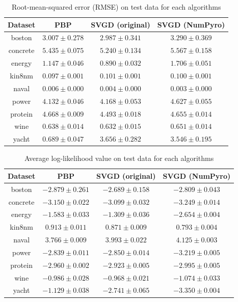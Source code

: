 \begin{table}[]
\centering
\caption{Root-mean-squared error (RMSE) on test data for each algorithms} 
\label{tab:bnn_rmse}
\begin{tabular}{|c|ccc|}
\hline
 Dataset & PBP & SVGD (original) & SVGD (NumPyro)  \\
 \hline
boston & $3.007 \pm 0.278$ & $2.987 \pm 0.341$ & $3.290 \pm 0.369$ \\
concrete & $5.435 \pm 0.075$ & $5.240 \pm 0.134$ & $5.567 \pm 0.158$ \\
energy & $1.147 \pm 0.046$ & $0.890 \pm 0.032$ & $1.706 \pm 0.051$ \\
kin8nm & $0.097 \pm 0.001$ & $0.101 \pm 0.001$ & $0.100 \pm 0.001$ \\
naval & $0.006 \pm 0.000$ & $0.004 \pm 0.000$ & $0.003 \pm 0.000$ \\
power & $4.132 \pm 0.046$ & $4.168 \pm 0.053$ & $4.627 \pm 0.055$ \\
protein & $4.668 \pm 0.009$ & $4.493 \pm 0.018$ & $4.655 \pm 0.014$ \\
wine & $0.638 \pm 0.014$ & $0.632 \pm 0.015$ & $0.651 \pm 0.014$ \\
yacht & $0.689 \pm 0.047$ & $3.656 \pm 0.282$ & $3.546 \pm 0.195$ \\
\hline
\end{tabular}
\end{table}

\begin{table}[]
\centering
\caption{Average log-likelihood value on test data for each algorithms} 
\label{tab:bnn_logl}
\begin{tabular}{|c|ccc|}
\hline
 Dataset & PBP & SVGD (original) & SVGD (NumPyro)  \\
 \hline
boston & $-2.879 \pm 0.261$ & $-2.689 \pm 0.158$ & $-2.809 \pm 0.043$ \\
concrete & $-3.150 \pm 0.022$ & $-3.099 \pm 0.032$ & $-3.249 \pm 0.014$ \\
energy & $-1.583 \pm 0.033$ & $-1.309 \pm 0.036$ & $-2.654 \pm 0.004$ \\
kin8nm & $0.913 \pm 0.011$ & $0.871 \pm 0.009$ & $0.793 \pm 0.004$ \\
naval & $3.766 \pm 0.009$ & $3.993 \pm 0.022$ & $4.125 \pm 0.003$ \\
power & $-2.839 \pm 0.011$ & $-2.850 \pm 0.014$ & $-3.219 \pm 0.005$ \\
protein & $-2.960 \pm 0.002$ & $-2.923 \pm 0.005$ & $-2.995 \pm 0.005$ \\
wine & $-0.986 \pm 0.028$ & $-0.968 \pm 0.021$ & $-1.074 \pm 0.033$ \\
yacht & $-1.129 \pm 0.038$ & $-2.741 \pm 0.065$ & $-3.350 \pm 0.004$ \\
\hline
\end{tabular}
\end{table}

